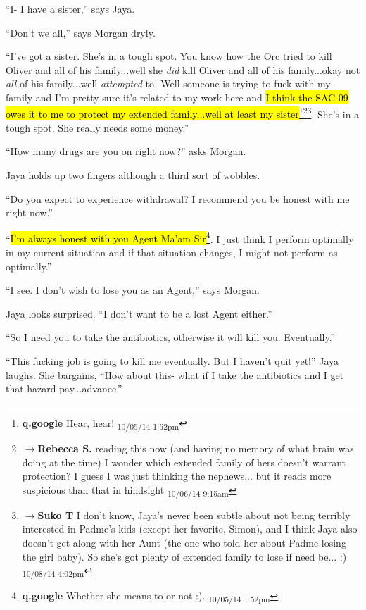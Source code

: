 ``I- I have a sister,'' says Jaya.

``Don't we all,'' says Morgan dryly.

``I've got a sister.  She's in a tough spot.  You know how the Orc tried to kill Oliver and all of his family...well she \textit{did} kill Oliver and all of his family...okay not \textit{all} of his family...well \textit{attempted} to-  Well someone is trying to fuck with my family and I'm pretty sure it's related to my work here and \hl{I think the SAC-09 owes it to me to protect my extended family...well at least my sister}\footnote{\textbf{q.google }Hear, hear! \textsubscript{10/05/14 1:52pm}}\footnote{$\rightarrow$\textbf{Rebecca S. }reading this now (and having no memory of what brain was doing at the time) I wonder which extended family of hers doesn't warrant protection?  I guess I was just thinking the nephews... but it reads more suspicious than that in hindsight \textsubscript{10/06/14 9:15am}}\footnote{$\rightarrow$\textbf{Suko T }I don't know, Jaya's never been subtle about not being terribly interested in Padme's kids (except her favorite, Simon), and I think Jaya also doesn't get along with her Aunt (the one who told her about Padme losing the girl baby).  So she's got plenty of extended family to lose if need be... :) \textsubscript{10/08/14 4:02pm}}.  She's in a tough spot.  She really needs some money.''

``How many drugs are you on right now?'' asks Morgan.

Jaya holds up two fingers although a third sort of wobbles.

``Do you expect to experience withdrawal?  I recommend you be honest with me right now.''

``\hl{I'm always honest with you Agent Ma'am Sir}\footnote{\textbf{q.google }Whether she means to or not :). \textsubscript{10/05/14 1:52pm}}.  I just think I perform optimally in my current situation and if that situation changes, I might not perform as optimally.''

``I see.  I don't wish to lose you as an Agent,'' says Morgan.

Jaya looks surprised.  ``I don't want to be a lost Agent either.''

``So I need you to take the antibiotics, otherwise it will kill you.  Eventually.''

``This fucking job is going to kill me eventually.  But I haven't quit yet!'' Jaya laughs.  She bargains, ``How about this- what if I take the antibiotics and I get that hazard pay...advance.''

